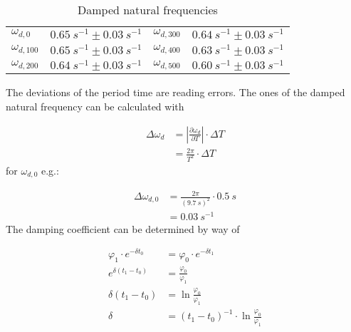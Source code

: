             \begin{table}[h]
                \centering
                \caption[Damped natural frequencies]{Damped natural frequencies}
                \begin{tabular}{@{}llll@{}}
                    \toprule
                    $\omega_{d,0}$      &$\SI{0.65}{s^{-1}} \pm \SI{0.03}{s^{-1}}$  &\hspace{10mm}$\omega_{d,300}$  &$\SI{0.64}{s^{-1}} \pm \SI{0.03}{s^{-1}}$\\
                    $\omega_{d,100}$    &$\SI{0.65}{s^{-1}} \pm \SI{0.03}{s^{-1}}$  &\hspace{10mm}$\omega_{d,400}$  &$\SI{0.63}{s^{-1}} \pm \SI{0.03}{s^{-1}}$\\
                    $\omega_{d,200}$    &$\SI{0.64}{s^{-1}} \pm \SI{0.03}{s^{-1}}$  &\hspace{10mm}$\omega_{d,500}$  &$\SI{0.60}{s^{-1}} \pm \SI{0.03}{s^{-1}}$\\
                    \bottomrule
                \end{tabular}
                \label{tab:damped_natural_frequencies}
            \end{table}
            The deviations of the period time are reading errors. The ones of the damped natural frequency can be calculated with\par
            \begin{align}
                \Delta \omega_d &=\left|\frac{\partial \omega_d}{\partial T}\right| \cdot \Delta T \nonumber \\
                                &=\frac{2\pi}{T^2}\cdot \Delta T
            \end{align}
            for \(\omega_{d,0}\) e.g.:\par
            \begin{align}
                \Delta\omega_{d,0}  &=\frac{2\pi}{(\SI{9.7}{s})^2}\cdot \SI{0.5}{s} \nonumber \\
                                    &=\SI{0.03}{s^{-1}}
            \end{align}
            The damping coefficient can be determined by way of\par
            \begin{align}
                \varphi_1 \cdot e^{-\delta t_0} &=\varphi_0 \cdot e^{-\delta t_1} \nonumber \\%
                e^{\delta(t_1-t_0)}             &=\frac{\varphi_0}{\varphi_1} \nonumber \\%
                \delta(t_1-t_0)                 &=\ln{\frac{\varphi_0}{\varphi_1}} \nonumber \\%
                \delta                          &=(t_1-t_0)^{-1}\cdot\ln{\frac{\varphi_0}{\varphi_1}}
            \end{align}
